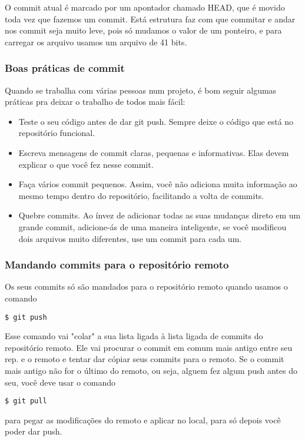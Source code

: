 \documentclass{article}
\begin{document}
    O commit atual é marcado por um apontador chamado HEAD, que é movido toda vez
que fazemos um commit. Está estrutura faz com que commitar e andar nos commit seja
muito leve, pois só mudamos o valor de um ponteiro, e para carregar os arquivo usamos
um arquivo de 41 bits.

\subsubsection{Boas práticas de commit}
    Quando se trabalha com várias pessoas num projeto, é bom seguir algumas práticas
pra deixar o trabalho de todos mais fácil:
    \begin{itemize}
        \item Teste o seu código antes de dar git push. Sempre deixe o código que 
                está no repositório funcional.
        \item Escreva mensagens de commit claras, pequenas e informativas. Elas devem
                explicar o que você fez nesse commit.
        \item Faça vários commit pequenos. Assim, você não adiciona muita informação
                ao mesmo tempo dentro do repositório, facilitando a volta de commits. %
        \item Quebre commits. Ao ínvez de adicionar todas as suas mudanças direto em um grande commit,
                adicione-ás de uma maneira inteligente, se você modificou dois arquivos muito diferentes,
                use um commit para cada um.
    \end{itemize}

\subsubsection{Mandando commits para o repositório remoto}
    Os seus commits só são mandados para o repositório remoto quando usamos o comando
\begin{tabbing}
    \hspace{1cm}\=\verb#$ git push#
\end{tabbing}
    
    Esse comando vai "colar" a sua lista ligada à lista ligada de commits do repositório remoto.
Ele vai procurar o commit em comum mais antigo entre seu rep. e o remoto e tentar dar cópiar seus
commits para o remoto. Se o commit mais antigo não for o último do remoto, ou seja, alguem fez algum
push antes do seu, você deve usar o comando  
\begin{tabbing}
    \hspace{1cm}\=\verb#$ git pull#
\end{tabbing}
para pegar as modificações do remoto e aplicar no local, para só depois você poder dar push.
\end{document}
